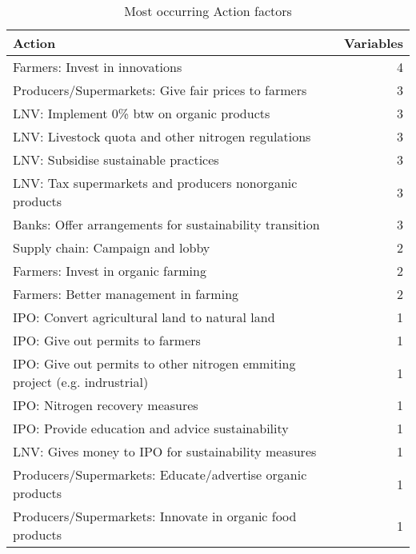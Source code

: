 \begin{table}
\caption{Most occurring Action factors}
\begin{tabular}{|l|r|}
\hline
Action & Variables \\
\hline
Farmers: Invest in innovations & 4 \\
Producers/Supermarkets: Give fair prices to farmers & 3 \\
LNV: Implement 0\% btw on organic products & 3 \\
LNV: Livestock quota and other nitrogen regulations & 3 \\
LNV: Subsidise sustainable practices & 3 \\
LNV: Tax supermarkets and producers nonorganic products & 3 \\
Banks: Offer arrangements for sustainability transition & 3 \\
Supply chain: Campaign and lobby & 2 \\
Farmers: Invest in organic farming & 2 \\
Farmers: Better management in farming & 2 \\
IPO: Convert agricultural land to natural land & 1 \\
IPO: Give out permits to farmers & 1 \\
IPO: Give out permits to other nitrogen emmiting project (e.g. indrustrial) & 1 \\
IPO: Nitrogen recovery measures & 1 \\
IPO: Provide education and advice sustainability & 1 \\
LNV: Gives money to IPO for sustainability measures & 1 \\
Producers/Supermarkets: Educate/advertise organic products & 1 \\
Producers/Supermarkets: Innovate in organic food products & 1 \\
\hline
\end{tabular}
\end{table}

